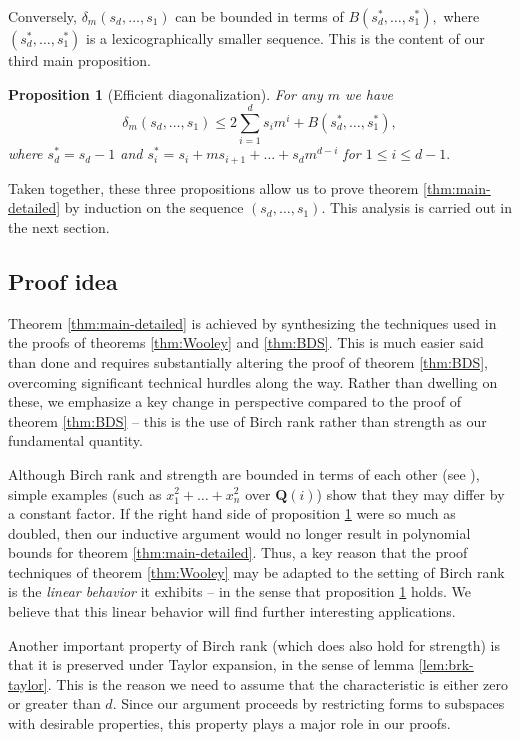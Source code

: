 \documentclass[10pt,a4paper]{amsart}
\newtheorem{proposition}[theorem]{Proposition}
\theoremstyle{definition}
\newcommand{\Q}{\mathbf{Q}}
\begin{document}
Conversely, $\delta_m(s_d,\ldots,s_1)$ can be bounded in terms of $B(s_d^*,\ldots,s_1^*),$ where $(s_d^*,\ldots,s_1^*)$ is a lexicographically smaller sequence. This is the content of our third main proposition.


\begin{proposition}[Efficient diagonalization]\label{prop:diag}
    For any $m$ we have 
    \[
    \delta_m(s_d,\ldots,s_1) \le 2\sum_{i=1}^d s_im^i+B(s^*_d,\ldots,s^*_1),
    \]
    where $s^*_d = s_d-1$ and $s^*_i = s_i+ms_{i+1}+\ldots+s_dm^{d-i}$ for $1\le i\le d-1.$ 
\end{proposition}




Taken together, these three propositions allow us to prove theorem \ref{thm:main-detailed} by induction on the sequence $(s_d,\ldots,s_1).$ This analysis is carried out in the next section.



\subsection{Proof idea} Theorem \ref{thm:main-detailed} is achieved by synthesizing the techniques used in the proofs of theorems \ref{thm:Wooley} and \ref{thm:BDS}. This is much easier said than done and requires substantially altering the proof of theorem  \ref{thm:BDS}, overcoming significant technical hurdles along the way. Rather than dwelling on these,  we emphasize a key change in perspective compared to the proof of theorem \ref{thm:BDS} -- this is the use of Birch rank rather than strength as our fundamental quantity. 

Although Birch rank and strength are bounded in terms of each other (see \cite{BDS-strength,BL, BDLZ}), simple examples (such as $x_1^2+\ldots + x_n^2$ over $\Q(i)$) show that they may differ by a constant factor. If the right hand side of proposition \ref{prop:diag} were so much as doubled, then our inductive argument would no longer result in polynomial bounds for theorem \ref{thm:main-detailed}. Thus, a key reason that the proof techniques of theorem \ref{thm:Wooley} may be adapted to the setting of Birch rank is the \emph{linear behavior} it exhibits -- in the sense that proposition \ref{prop:diag} holds. We believe that this linear behavior will find further interesting applications.
  
Another important property of Birch rank (which does  also hold for strength) is that it is preserved under Taylor expansion, in the sense of lemma \ref{lem:brk-taylor}. This is the reason we need to assume that the characteristic is either zero or greater than $d.$ Since our argument proceeds by restricting forms to subspaces with desirable properties, this property plays a major role in our proofs.
\end{document}
